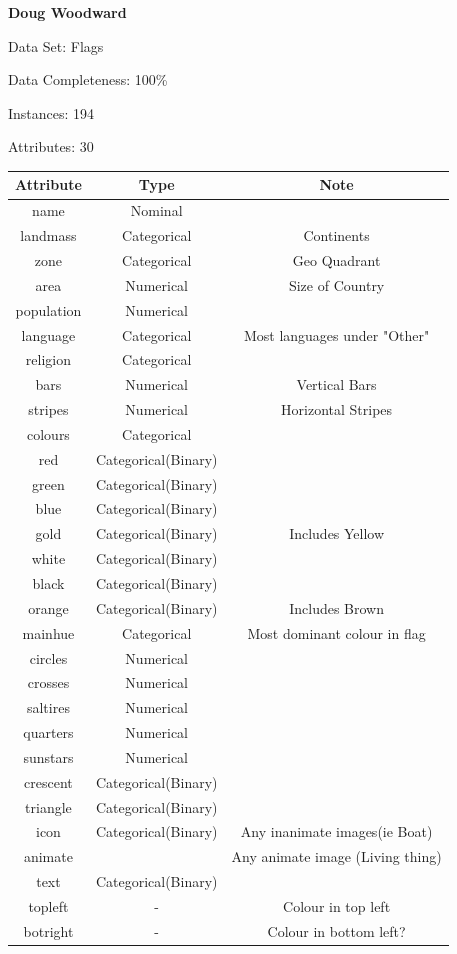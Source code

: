 \documentclass[11pt]{article}
\begin{document}
\textbf{Doug Woodward}

Data Set: Flags

Data Completeness: 100\%

Instances: 194

Attributes: 30

\begin{center}
\begin{tabular} { | c | c | c |}
\hline
Attribute & Type & Note \\ [0.5ex] 
\hline\hline
name & Nominal & \\
landmass & Categorical & Continents \\
zone & Categorical & Geo Quadrant \\
area & Numerical &  Size of Country \\
population & Numerical &  \\
language & Categorical &  Most languages under "Other" \\
religion & Categorical &   \\
bars & Numerical &  Vertical Bars \\
stripes & Numerical &  Horizontal Stripes \\
colours & Categorical &   \\
red & Categorical(Binary) &  \\
green & Categorical(Binary) &  \\
blue & Categorical(Binary) &  \\
gold & Categorical(Binary) &  Includes Yellow \\
white& Categorical(Binary) &  \\
black & Categorical(Binary) &  \\
orange & Categorical(Binary) &  Includes Brown \\
mainhue & Categorical &  Most dominant colour in flag \\
circles & Numerical &  \\
crosses & Numerical &  \\
saltires & Numerical &  \\
quarters & Numerical &  \\
sunstars & Numerical &  \\
crescent & Categorical(Binary)  &  \\
triangle & Categorical(Binary)  &  \\
icon & Categorical(Binary)  &  Any inanimate images(ie Boat) \\
animate &  &  Any animate image (Living thing) \\
text & Categorical(Binary)  &  \\
topleft & - &  Colour in top left \\
botright & - &  Colour in bottom left? \\
\hline
\end{tabular}
\end{center}
\end{document}

